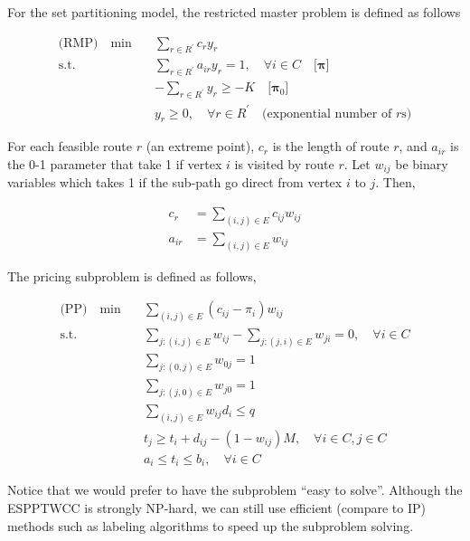         For the set partitioning model, the restricted master problem is defined as follows

        \begin{align*}
            \text{(RMP)} \quad \min \quad & \sum_{r \in R^\prime} c_r y_r\\
            \text{s.t.} \quad & \sum_{r \in R^\prime} a_{ir} y_r = 1, \quad \forall i \in C \quad \text{[$\mathbf{\pi}$]}\\
            & -\sum_{r\in R^\prime} y_r \ge -K  \quad \text{[$\mathbf{\pi}_0$]} \\
            & y_r \ge 0, \quad \forall r \in R^\prime \quad \text{(exponential number of $r$s)}
        \end{align*}

        For each feasible route $r$ (an extreme point), $c_r$ is the length of route $r$, and $a_{ir}$ is the 0-1 parameter that take 1 if vertex $i$ is visited by route $r$. Let $w_{ij}$ be binary variables which takes 1 if the sub-path go direct from vertex $i$ to $j$. Then,

        \begin{align*}
            c_r &= \sum_{(i, j) \in E} c_{ij} w_{ij} \\
            a_{ir} &= \sum_{(i, j) \in E} w_{ij}
        \end{align*}

        The pricing subproblem is defined as follows,

        \begin{align*}
            \text{(PP)} \quad \min \quad & \sum_{(i, j) \in E}(c_{ij} - \pi_i) w_{ij} \\
            \text{s.t.} \quad & \sum_{j: (i, j) \in E} w_{ij} - \sum_{j: (j, i) \in E} w_{ji} = 0, \quad \forall i \in C\\
            & \sum_{j: (0, j) \in E} w_{0j} = 1 \\
            & \sum_{j: (j, 0) \in E} w_{j0} = 1 \\
            & \sum_{(i, j) \in E} w_{ij} d_i \le q \\
            & t_j \ge t_i + d_{ij} - (1 - w_{ij}) M, \quad \forall i \in C, j \in C\\
            & a_i \le t_i \le b_i, \quad \forall i \in C
        \end{align*}

        Notice that we would prefer to have the subproblem ``easy to solve''. Although the ESPPTWCC is strongly NP-hard, we can still use efficient (compare to IP) methods such as labeling algorithms to speed up the subproblem solving.

